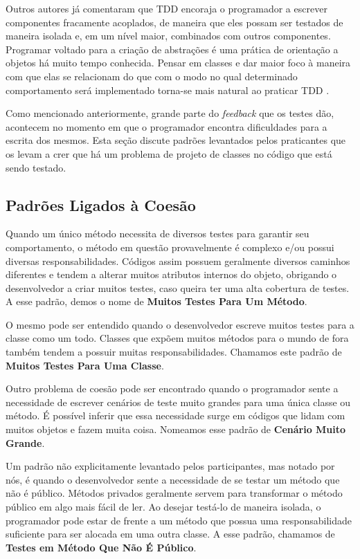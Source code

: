 Outros autores já comentaram que 
TDD encoraja o programador a escrever componentes fracamente acoplados, de
maneira que eles possam ser testados de maneira isolada e, em um nível maior,
combinados com outros componentes.
Programar voltado para a criação de abstrações é uma prática de orientação a objetos há muito
tempo conhecida. Pensar em classes e dar maior foco à maneira com que
elas se relacionam do que com o modo no qual determinado comportamento será implementado
torna-se mais natural ao praticar TDD \cite{GOOS}. 

Como mencionado anteriormente, grande parte do \textit{feedback} que os testes
dão, acontecem no momento em que o programador encontra dificuldades para a
escrita dos mesmos. Esta seção discute padrões levantados pelos praticantes
que os levam a crer que há um problema de projeto de classes no código
que está sendo testado.

\subsection{Padrões Ligados à Coesão}

Quando um único método necessita de diversos testes para garantir seu comportamento,
o método em questão provavelmente é complexo e/ou possui diversas responsabilidades.
Códigos assim possuem geralmente diversos caminhos
diferentes e tendem a alterar muitos atributos internos do objeto, obrigando o desenvolvedor
a criar muitos testes, caso queira ter uma alta cobertura de testes.
A esse padrão, demos o nome de \textbf{Muitos Testes Para Um Método}.

O mesmo pode ser entendido quando o desenvolvedor escreve muitos testes para a 
classe como um todo. Classes que expõem muitos métodos para o mundo de fora
também tendem a possuir muitas responsabilidades. Chamamos este padrão
de \textbf{Muitos Testes Para Uma Classe}.

Outro problema de coesão pode ser encontrado quando o programador
sente a necessidade de escrever cenários de teste muito grandes para uma
única classe ou método. É possível inferir que essa necessidade surge 
em códigos que lidam com muitos objetos e fazem muita coisa. Nomeamos
esse padrão de \textbf{Cenário Muito Grande}.

Um padrão não explicitamente levantado pelos participantes, mas notado
por nós, é quando o desenvolvedor sente a necessidade de se testar
um método que não é público. Métodos privados geralmente servem para 
transformar o método público em algo mais fácil de ler. Ao desejar
testá-lo de maneira isolada, o programador pode estar de frente a
um método que possua uma responsabilidade suficiente para ser
alocada em uma outra classe. A esse padrão, chamamos de 
\textbf{Testes em Método Que Não É Público}.

